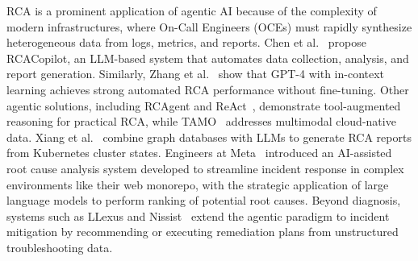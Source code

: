 \documentclass[sigconf]{acmart}
\begin{document}
RCA is a prominent application of agentic AI because of the complexity of modern infrastructures, where On-Call Engineers (OCEs) must rapidly synthesize heterogeneous data from logs, metrics, and reports. Chen et al.~\cite{chen2024automatic} propose RCACopilot, an LLM-based system that automates data collection, analysis, and report generation. Similarly, Zhang et al.~\cite{zhang2024automated} show that GPT-4 with in-context learning achieves strong automated RCA performance without fine-tuning. Other agentic solutions, including RCAgent and ReAct~\cite{wang2024rcagent,roy2024exploring}, demonstrate tool-augmented reasoning for practical RCA, while TAMO~\cite{zhang2025tamo} addresses multimodal cloud-native data. Xiang et al.~\cite{xiang2025simplifying} combine graph databases with LLMs to generate RCA reports from Kubernetes cluster states.
Engineers at Meta~\cite{hsu2024leveraging} introduced an AI-assisted root cause analysis system developed to streamline incident response in complex environments like their web monorepo, with the strategic application of large language models to perform ranking of potential root causes.
Beyond diagnosis, systems such as LLexus and Nissist~\cite{las2024llexus,an2024nissist} extend the agentic paradigm to incident mitigation by recommending or executing remediation plans from unstructured troubleshooting data.
\end{document}
